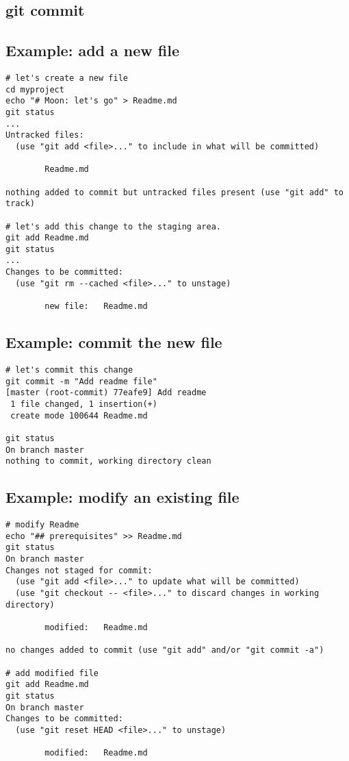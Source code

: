\subsection{git commit}
\begin{frame}[fragile]
    \subslidetitle
\end{frame}

\subsection{Example: add a new file}
\begin{frame}[fragile]
\subslidetitle
\begin{lstlisting}
# let's create a new file
cd myproject
echo "# Moon: let's go" > Readme.md
git status
...
Untracked files:
  (use "git add <file>..." to include in what will be committed)

        Readme.md

nothing added to commit but untracked files present (use "git add" to track)

# let's add this change to the staging area.
git add Readme.md
git status
...
Changes to be committed:
  (use "git rm --cached <file>..." to unstage)

        new file:   Readme.md
\end{lstlisting}
\end{frame}

\subsection{Example: commit the new file}
\begin{frame}[fragile]
\subslidetitle
\begin{lstlisting}
# let's commit this change
git commit -m "Add readme file"
[master (root-commit) 77eafe9] Add readme
 1 file changed, 1 insertion(+)
 create mode 100644 Readme.md

git status
On branch master
nothing to commit, working directory clean
\end{lstlisting}
\end{frame}

\subsection{Example: modify an existing file}
\begin{frame}[fragile]
\subslidetitle
\begin{lstlisting}
# modify Readme
echo "## prerequisites" >> Readme.md
git status
On branch master
Changes not staged for commit:
  (use "git add <file>..." to update what will be committed)
  (use "git checkout -- <file>..." to discard changes in working directory)

        modified:   Readme.md

no changes added to commit (use "git add" and/or "git commit -a")

# add modified file
git add Readme.md
git status
On branch master
Changes to be committed:
  (use "git reset HEAD <file>..." to unstage)

        modified:   Readme.md
\end{lstlisting}
\end{frame}

